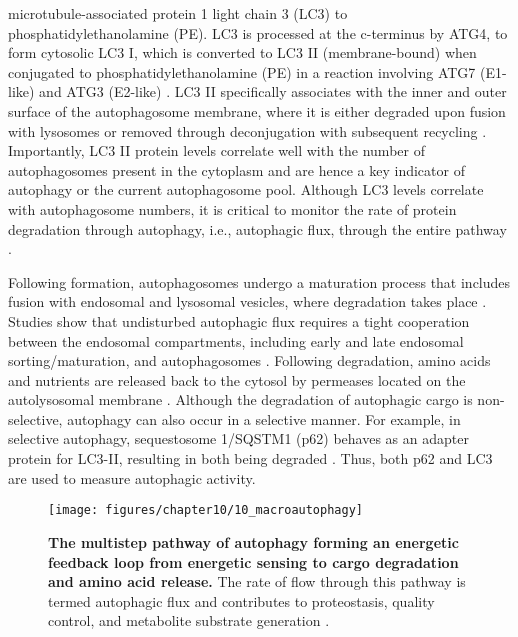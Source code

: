 microtubule-associated protein 1 light chain 3 (LC3) to phosphatidylethanolamine (PE). LC3 is processed at the c-terminus by ATG4, to form cytosolic LC3 I, which is converted to LC3 II (membrane-bound) when conjugated to phosphatidylethanolamine (PE) in a reaction involving ATG7 (E1-like) and ATG3 (E2-like) \citep{kabeya2000,Tanida2004}. LC3 II specifically associates with the inner and outer surface of the autophagosome membrane, where it is either degraded upon fusion with lysosomes or removed through deconjugation with subsequent recycling \citep{kabeya2000,Mijaljica2012,Tanida2004}. Importantly, LC3 II protein levels correlate well with the number of autophagosomes present in the cytoplasm and are hence a key indicator of autophagy or the current autophagosome pool. Although LC3 levels correlate with autophagosome numbers, it is critical to monitor the rate of protein degradation through autophagy, i.e., autophagic flux, through the entire pathway \citep{klionsky2016,loos2014}. 

Following formation, autophagosomes undergo a maturation process that includes fusion with endosomal and lysosomal vesicles, where degradation takes place \citep{Eskelinen2005}. Studies show that undisturbed autophagic flux requires a tight cooperation between the endosomal compartments, including early and late endosomal sorting/maturation, and autophagosomes \citep{Eskelinen2005}. Following degradation, amino acids and nutrients are released back to the cytosol by permeases located on the autolysosomal membrane \citep{Loos2013}. Although the degradation of autophagic cargo is non-selective, autophagy can also occur in a selective manner. For example, in selective autophagy, sequestosome 1/SQSTM1 (p62) behaves as an adapter protein for LC3-II, resulting in both being degraded \citep{Klionsky2005,Singh2011}. Thus, both p62 and LC3 are used to measure autophagic activity. 

\begin{landscape}
\begin{figure}[!htbp]
\vspace{4.5cm}
  \texttt{[image: figures/chapter10/10\_macroautophagy]}
  \caption[The multistep pathway of autophagy forming an energetic feedback loop from energetic sensing to cargo degradation and amino acid release]{\textbf{The multistep pathway of autophagy forming an energetic feedback loop from energetic sensing to cargo degradation and amino acid release.} The rate of flow through this pathway is termed autophagic flux and contributes to proteostasis, quality control, and metabolite substrate generation \citep{Ntsapi2018}.}
  \label{fig:10_macroautophagy}
\end{figure}
\end{landscape}

